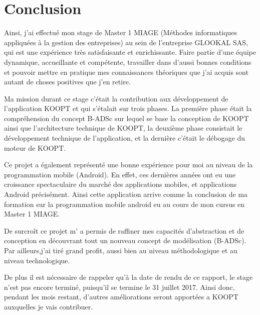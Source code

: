 \chapter*{Conclusion}
\label{chap:conclusion}

Ainsi, j’ai effectué mon stage de  Master 1 MIAGE (Méthodes informatiques appliquées à la gestion des entreprises) au sein de l'entreprise GLOOKAL SAS, qui est une expérience très satisfaisante et enrichissante. Faire partie d’une équipe dynamique, accueillante et compétente, travailler dans d’aussi bonnes conditions et pouvoir mettre en pratique mes connaissances théoriques que j’ai acquis sont autant de choses positives que j’en retire. 
 
Ma mission durant ce stage c’était la contribution aux développement de l’application KOOPT et qui s’étalait sur trois phases. La première phase était la compréhension du concept B-ADSc sur lequel se base la conception de KOOPT ainsi que l’architecture technique de KOOPT, la deuxième phase consistait le développement technique  de l'application, et la dernière c’était le débogage du moteur de KOOPT.
					
Ce projet a également représenté une bonne expérience pour moi au niveau de la programmation mobile (Android). En effet, ces dernières années ont eu une croissance spectaculaire du marché des applications mobiles, et applications Android précisément.
Ainsi cette application arrive comme la conclusion de ma formation sur la programmation mobile android eu au cours de mon cursus en Master 1 MIAGE. 
	
De surcroît ce projet m’ a permis de raffiner mes capacités d’abstraction et de conception en découvrant tout un nouveau concept de modélisation (B-ADSc). Par ailleurs,j’ai tiré grand profit, aussi bien au niveau méthodologique et au niveau technologique.
 
		 	 	 							
De plus il est nécessaire de rappeler qu’à la date de rendu de ce rapport, le stage n’est pas encore terminé, puisqu’il se termine le 31 juillet 2017. Ainsi donc, pendant les mois restant, d’autres améliorations seront apportées a KOOPT auxquelles je vais contribuer.
 
